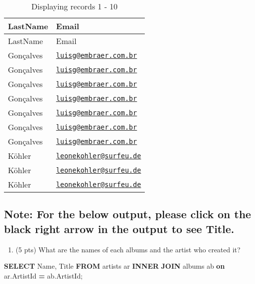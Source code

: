 \documentclass[
]{article}
\newenvironment{Shaded}{\begin{snugshade}}{\end{snugshade}}
\newcommand{\KeywordTok}[1]{\textcolor[rgb]{0.13,0.29,0.53}{\textbf{#1}}}
\newcommand{\NormalTok}[1]{#1}
\newcommand{\OperatorTok}[1]{\textcolor[rgb]{0.81,0.36,0.00}{\textbf{#1}}}
\providecommand{\tightlist}{%
  \setlength{\itemsep}{0pt}\setlength{\parskip}{0pt}}
\begin{document}
\begin{longtable}[]{@{}ll@{}}
\caption{Displaying records 1 - 10}\tabularnewline
\toprule
LastName & Email \\
\midrule
\endfirsthead
\toprule
LastName & Email \\
\midrule
\endhead
Gonçalves &
\href{mailto:luisg@embraer.com.br}{\nolinkurl{luisg@embraer.com.br}} \\
Gonçalves &
\href{mailto:luisg@embraer.com.br}{\nolinkurl{luisg@embraer.com.br}} \\
Gonçalves &
\href{mailto:luisg@embraer.com.br}{\nolinkurl{luisg@embraer.com.br}} \\
Gonçalves &
\href{mailto:luisg@embraer.com.br}{\nolinkurl{luisg@embraer.com.br}} \\
Gonçalves &
\href{mailto:luisg@embraer.com.br}{\nolinkurl{luisg@embraer.com.br}} \\
Gonçalves &
\href{mailto:luisg@embraer.com.br}{\nolinkurl{luisg@embraer.com.br}} \\
Gonçalves &
\href{mailto:luisg@embraer.com.br}{\nolinkurl{luisg@embraer.com.br}} \\
Köhler &
\href{mailto:leonekohler@surfeu.de}{\nolinkurl{leonekohler@surfeu.de}} \\
Köhler &
\href{mailto:leonekohler@surfeu.de}{\nolinkurl{leonekohler@surfeu.de}} \\
Köhler &
\href{mailto:leonekohler@surfeu.de}{\nolinkurl{leonekohler@surfeu.de}} \\
\bottomrule
\end{longtable}

\hypertarget{note-for-the-below-output-please-click-on-the-black-right-arrow-in-the-output-to-see-title.}{%
\subsection{Note: For the below output, please click on the black right
arrow in the output to see
Title.}\label{note-for-the-below-output-please-click-on-the-black-right-arrow-in-the-output-to-see-title.}}

\begin{enumerate}
\def\labelenumi{\arabic{enumi}.}
\setcounter{enumi}{1}
\tightlist
\item
  (5 pts) What are the names of each albums and the artist who created
  it?
\end{enumerate}

\begin{Shaded}
\begin{Highlighting}[]

\KeywordTok{SELECT}\NormalTok{ Name, Title}
\KeywordTok{FROM}\NormalTok{ artists ar }\KeywordTok{INNER} \KeywordTok{JOIN}\NormalTok{ albums ab}
\KeywordTok{on}\NormalTok{ ar.ArtistId }\OperatorTok{=}\NormalTok{ ab.ArtistId;}
\end{Highlighting}
\end{Shaded}
\end{document}
